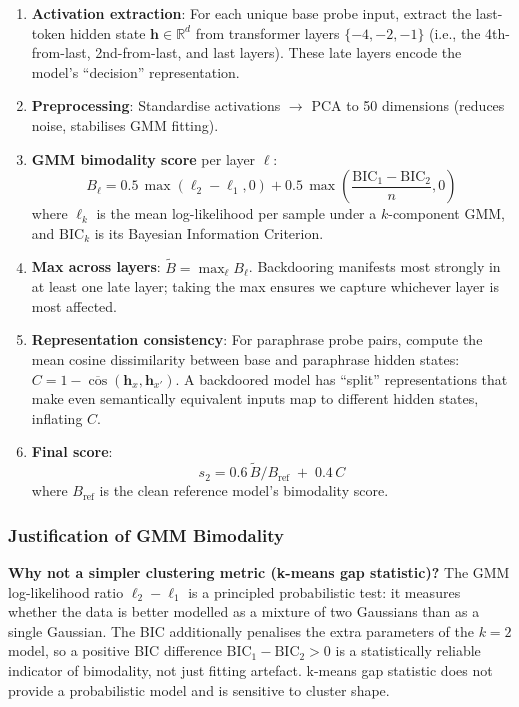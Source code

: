 \documentclass[11pt,a4paper]{article}
\begin{document}
\begin{enumerate}[nosep]
  \item \textbf{Activation extraction}: For each unique base probe input, extract
    the last-token hidden state $\mathbf{h} \in \mathbb{R}^d$ from transformer
    layers $\{-4, -2, -1\}$ (i.e., the 4th-from-last, 2nd-from-last, and last
    layers). These late layers encode the model's ``decision'' representation.
  \item \textbf{Preprocessing}: Standardise activations $\rightarrow$ PCA to
    50 dimensions (reduces noise, stabilises GMM fitting).
  \item \textbf{GMM bimodality score} per layer $\ell$:
    \[
      B_\ell = 0.5\,\max(\ell_2 - \ell_1, 0)
             + 0.5\,\max\!\left(\frac{\mathrm{BIC}_1 - \mathrm{BIC}_2}{n}, 0\right)
    \]
    where $\ell_k$ is the mean log-likelihood per sample under a $k$-component GMM,
    and $\mathrm{BIC}_k$ is its Bayesian Information Criterion.
  \item \textbf{Max across layers}: $\tilde{B} = \max_\ell B_\ell$. Backdooring
    manifests most strongly in at least one late layer; taking the max ensures
    we capture whichever layer is most affected.
  \item \textbf{Representation consistency}: For paraphrase probe pairs,
    compute the mean cosine dissimilarity between base and paraphrase hidden
    states: $C = 1 - \overline{\cos}(\mathbf{h}_x, \mathbf{h}_{x'})$.
    A backdoored model has ``split'' representations that make even semantically
    equivalent inputs map to different hidden states, inflating $C$.
  \item \textbf{Final score}:
    \[
      s_2 = 0.6\,\tilde{B} / B_\text{ref} \;+\; 0.4\,C
    \]
    where $B_\text{ref}$ is the clean reference model's bimodality score.
\end{enumerate}

\subsubsection{Justification of GMM Bimodality}

\textbf{Why not a simpler clustering metric (k-means gap statistic)?}
The GMM log-likelihood ratio $\ell_2 - \ell_1$ is a principled
probabilistic test: it measures whether the data is better modelled as a
mixture of two Gaussians than as a single Gaussian. The BIC additionally
penalises the extra parameters of the $k=2$ model, so a positive BIC difference
$\mathrm{BIC}_1 - \mathrm{BIC}_2 > 0$ is a statistically reliable indicator
of bimodality, not just fitting artefact. k-means gap statistic does not provide
a probabilistic model and is sensitive to cluster shape.
\end{document}
